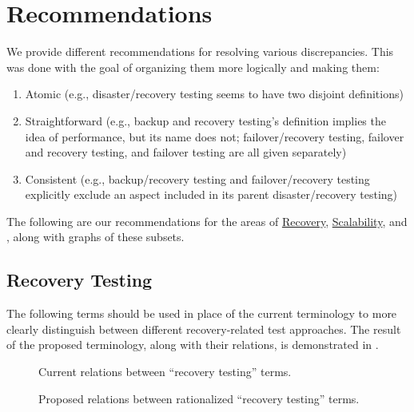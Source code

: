 \section{Recommendations}
\label{recs}

We provide different recommendations for resolving various
discrepancies. This was done with the goal of
organizing them more logically and making them:
\begin{enumerate}
      \item Atomic (e.g., disaster/recovery testing seems to have two
            disjoint definitions)
      \item Straightforward (e.g., backup and recovery testing's definition
            implies the idea of performance, but its name does not;
            failover/recovery testing, failover and recovery testing,
            and failover testing are all given separately)
      \item Consistent (e.g., backup/recovery testing and failover/recovery
            testing explicitly exclude an aspect included in its parent
            disaster/recovery testing)
\end{enumerate}
The following are our recommendations for the areas of
\hyperref[rec-test-rec]{Recovery}, \hyperref[scal-test-rec]{Scalability}, and
, along with graphs of these subsets.

\subsection{Recovery Testing}
\label{rec-test-rec}
The following terms should be used in place of the current terminology to
more clearly distinguish between different recovery-related test approaches.
The result of the proposed terminology, along with their relations, is
demonstrated in .

\begin{figure}[bt!]
      \centering
      \begin{minipage}{.575\linewidth}
            \centering
            \recoveryGraphCurrent{}
            \caption{Current relations between ``recovery
                  testing'' terms.}
            \label{fig:recovery-graph-current}
      \end{minipage}%
      \begin{minipage}{.425\linewidth}
            \centering
            \recoveryGraphProposed{}
            \caption{Proposed relations between
                  rationalized ``recovery testing'' terms.}
            \label{fig:recovery-graph-proposed}
      \end{minipage}
\end{figure}


